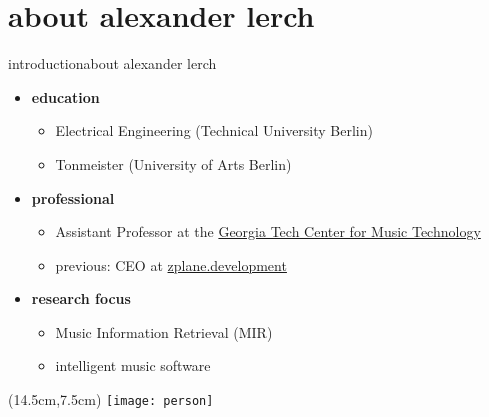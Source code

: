 




\subtitle{Module 0.0: Introduction to the online course}


	

    \section[about]{about alexander lerch}
        \begin{frame}{introduction}{about alexander lerch}
            \begin{itemize}
                \item   \textbf{education}
                    \begin{itemize}
                        \item   Electrical Engineering (Technical University Berlin)
                        \item   Tonmeister (University of Arts Berlin)
                    \end{itemize}
        \smallskip
                \item   \textbf{professional}
                    \begin{itemize}
                        \item   Assistant Professor at the \href{http://gtcmt.gatech.edu}{Georgia Tech Center for Music Technology}
                        \item   previous: CEO at \href{http://www.zplane.de}{zplane.development}
                    \end{itemize}
        \smallskip
                \item   \textbf{research focus}
                    \begin{itemize}
                        \item   Music Information Retrieval (MIR)
                        \item   intelligent music software
                    \end{itemize}
            \end{itemize}
            
            \begin{textblock*}{100mm}(14.5cm,7.5cm)
                \texttt{[image: person]}
            \end{textblock*}
        \end{frame}

